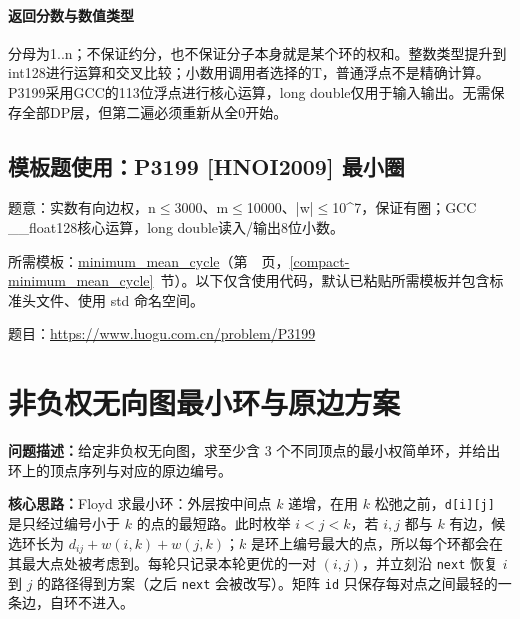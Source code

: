 \paragraph{返回分数与数值类型} 分母为1..n；不保证约分，也不保证分子本身就是某个环的权和。整数类型提升到int128进行运算和交叉比较；小数用调用者选择的T，普通浮点不是精确计算。P3199采用GCC的113位浮点进行核心运算，long double仅用于输入输出。无需保存全部DP层，但第二遍必须重新从全0开始。

\Needspace{374pt}

\subsection*{模板题使用：P3199 [HNOI2009] 最小圈}

\label{usage-example-380}

题意：实数有向边权，n$\le$3000、m$\le$10000、|w|$\le$10\textasciicircum{}7，保证有圈；GCC \_\_float128核心运算，long double读入/输出8位小数。

所需模板：\hyperref[compact-minimum_mean_cycle]{minimum\_\allowbreak{}mean\_\allowbreak{}cycle}（第~\pageref{compact-minimum_mean_cycle}~页，\ref{compact-minimum_mean_cycle}~节）。以下仅含使用代码，默认已粘贴所需模板并包含标准头文件、使用 std 命名空间。

题目：\url{https://www.luogu.com.cn/problem/P3199}



\section{非负权无向图最小环与原边方案}\label{compact-MinCycle}

\noindent\textbf{问题描述：}\allowbreak 给定非负权无向图，求至少含 3 个不同顶点的最小权简单环，并给出环上的顶点序列与对应的原边编号。

\textbf{核心思路：}\allowbreak Floyd 求最小环：外层按中间点 $k$ 递增，在用 $k$ 松弛之前，\texttt{d[i][j]} 是只经过编号小于 $k$ 的点的最短路。此时枚举 $i<j<k$，若 $i,j$ 都与 $k$ 有边，候选环长为 $d_{ij}+w(i,k)+w(j,k)$；$k$ 是环上编号最大的点，所以每个环都会在其最大点处被考虑到。每轮只记录本轮更优的一对 $(i,j)$，并立刻沿 \texttt{next} 恢复 $i$ 到 $j$ 的路径得到方案（之后 \texttt{next} 会被改写）。矩阵 \texttt{id} 只保存每对点之间最轻的一条边，自环不进入。



